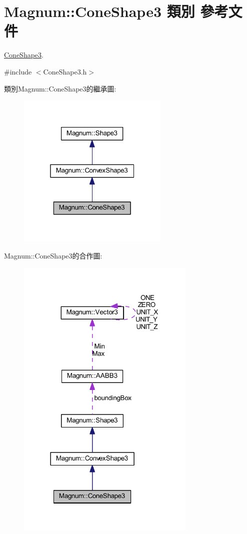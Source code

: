 \hypertarget{class_magnum_1_1_cone_shape3}{}\section{Magnum\+:\+:Cone\+Shape3 類別 參考文件}
\label{class_magnum_1_1_cone_shape3}


\hyperlink{class_magnum_1_1_cone_shape3}{Cone\+Shape3}.  




{\ttfamily \#include $<$Cone\+Shape3.\+h$>$}



類別\+Magnum\+:\+:Cone\+Shape3的繼承圖\+:\nopagebreak
\begin{figure}[H]
\begin{center}
\leavevmode
\includegraphics[width=205pt]{class_magnum_1_1_cone_shape3__inherit__graph}
\end{center}
\end{figure}


Magnum\+:\+:Cone\+Shape3的合作圖\+:\nopagebreak
\begin{figure}[H]
\begin{center}
\leavevmode
\includegraphics[width=242pt]{class_magnum_1_1_cone_shape3__coll__graph}
\end{center}
\end{figure}
